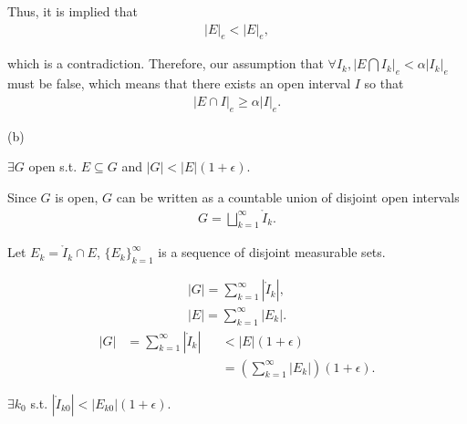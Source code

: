 \documentclass[UTF8,a4paper,10pt]{article}
\begin{document}
\begin{solution}
    Thus, it is implied that 
    \begin{equation*}
      \begin{aligned}
        |E|_e < |E|_e,
      \end{aligned}
    \end{equation*}

    which is a contradiction. Therefore, our assumption that \(\forall I_k, \left|E\bigcap I_k\right|_e <\alpha |I_k|_e\) must be false, which means that 
    there exists an open interval \(I\) so that
    \begin{equation*}
      \begin{aligned}
        |E \cap I|_e \geq \alpha |I|_e.
      \end{aligned}
    \end{equation*}

\dotfill

(b)


\(\exists G\) open s.t. \(E\subseteq G\) and \(|G| < |E|(1+\epsilon) \).

Since \(G\) is open, \(G\) can be written as a countable union of disjoint open intervals
\begin{equation*}
  \begin{aligned}
    G = \bigsqcup_{k = 1}^{\infty}\mathring{I}_k.
  \end{aligned}
\end{equation*}

Let \(E_k = \mathring{I}_k\cap E\), \(\{E_k\}_{k=1}^{\infty}\) is a sequence of disjoint measurable sets.

\begin{equation*}
  \begin{aligned}
    |G| = \sum_{k = 1}^{\infty}|\mathring{I}_k|,\\
    |E| = \sum_{k = 1}^{\infty}|E_k|.
  \end{aligned}
\end{equation*}
\begin{equation}
  \begin{aligned}
    |G| 
    &= \sum_{k = 1}^{\infty}|\mathring{I}_k|&&<|E|(1+\epsilon)\\
    &&&=\left(\sum_{k = 1}^{\infty}|E_k|\right)(1+\epsilon).\label{eq.01}
  \end{aligned}
\end{equation}

\(\exists k_0\) s.t. \(|\mathring{I}_{k0}|<|E_{k0}|(1+\epsilon)\).


\end{solution}
\end{document}
